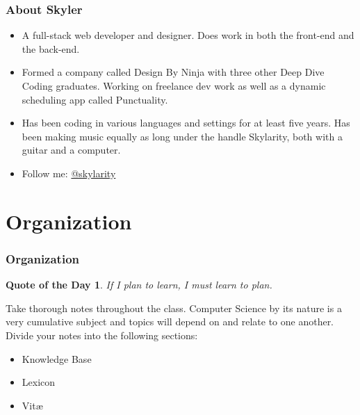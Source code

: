 \documentclass[aspectratio=169]{beamer}
\newtheorem{qotd}{Quote of the Day}
\begin{document}
\begin{frame}
\frametitle{About Skyler}

\begin{itemize}
   \item A full-stack web developer and designer. Does work in both the front-end and the back-end.
   \item Formed a company called Design By Ninja with three other Deep Dive Coding graduates. Working on freelance dev work as well as a dynamic scheduling app called Punctuality.
   \item Has been coding in various languages and settings for at least five years. Has been making music equally as long under the handle Skylarity, both with a guitar and a computer.
   \item Follow me:  \href{https://twitter.com/skylarity}{@skylarity}
\end{itemize}
\end{frame}


\section{Organization}
\begin{frame}
\frametitle{Organization}
\begin{qotd}
If I plan to learn, I must learn to plan.
\end{qotd}
\pause

Take thorough notes throughout the class. Computer Science by its nature is a very cumulative subject and topics will depend on and relate to one another. Divide your notes into the following sections:

\pause
\begin{itemize}
	\item Knowledge Base
	\item Lexicon
	\item Vit\ae
\end{itemize}
\end{frame}
\end{document}
